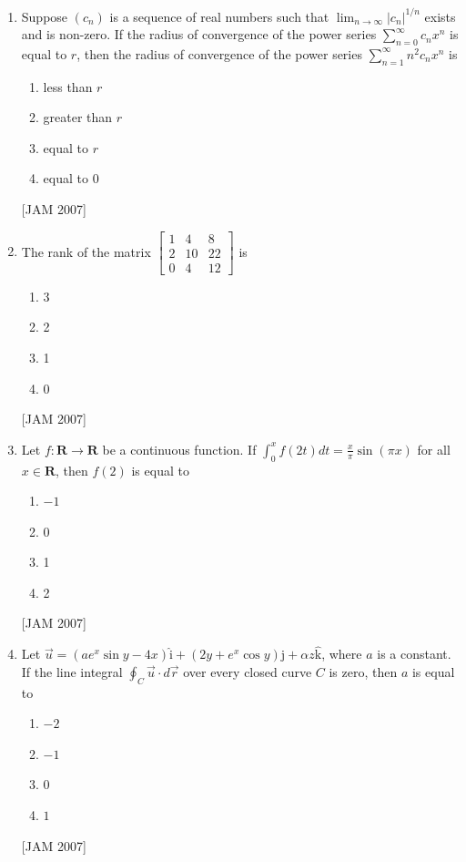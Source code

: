 \begin{enumerate}
 
\item Suppose $\left(c_{n}\right)$ is a sequence of real numbers such that $\lim _{n \rightarrow \infty}\left|c_{n}\right|^{1 / n}$ exists and is non-zero. If the radius of convergence of the power series $\sum_{n=0}^{\infty} c_{n} x^{n}$ is equal to $r$, then the radius of convergence of the power series $\sum_{n=1}^{\infty} n^{2} c_{n} x^{n}$ is

\begin{enumerate}
\item less than $r$
\item greater than $r$
\item equal to $r$
\item equal to 0
\end{enumerate}
 \hfill [JAM 2007]


 
\item The rank of the matrix $\left[\begin{array}{ccc}1 & 4 & 8 \\ 2 & 10 & 22 \\ 0 & 4 & 12\end{array}\right]$ is
\begin{enumerate}
\item 3
\item 2
\item 1
\item 0
\end{enumerate}
 \hfill [JAM 2007]





  \item Let $f: \mathbf{R} \rightarrow \mathbf{R}$ be a continuous function. If $\int_{0}^{x} f(2 t) d t=\frac{x}{\pi} \sin (\pi x)$ for all $x \in \mathbf{R}$, then $f(2)$ is equal to
  \begin{enumerate}
\item $-1$
\item 0
\item 1
\item 2
\end{enumerate}
 \hfill [JAM 2007]



 
\item Let $\vec{u}=\left(a e^{x} \sin y-4 x\right) \hat{\mathrm{i}}+\left(2 y+e^{x} \cos y\right) \hat{\mathrm{j}}+\alpha z \hat{\mathrm{k}}$, where $a$ is a constant. If the line integral $\oint_{C} \vec{u} \cdot d \vec{r}$ over every closed curve $C$ is zero, then $a$ is equal to
\begin{enumerate}
\item $-2$
\item $-1$
\item $0$
\item $1$
\end{enumerate}
 \hfill [JAM 2007]


\end{enumerate}
